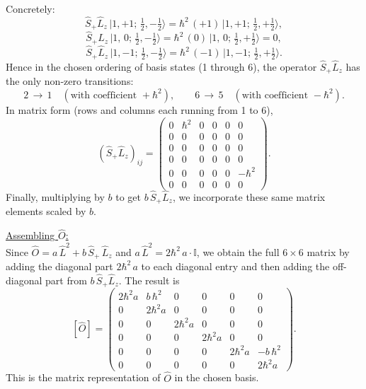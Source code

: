 \documentclass{article}
\begin{document}
Concretely:
\[
\hat{S}_+ \hat{L}_z\,\lvert 1,+1;\,\tfrac12,-\tfrac12\rangle 
= 
\hbar^2\,(+1)\,\lvert 1,+1;\,\tfrac12,+\tfrac12\rangle,
\]
\[
\hat{S}_+ \hat{L}_z\,\lvert 1,\,0;\,\tfrac12,-\tfrac12\rangle 
= 
\hbar^2\,(0)\,\lvert 1,\,0;\,\tfrac12,+\tfrac12\rangle = 0,
\]
\[
\hat{S}_+ \hat{L}_z\,\lvert 1,-1;\,\tfrac12,-\tfrac12\rangle 
= 
\hbar^2\,(-1)\,\lvert 1,-1;\,\tfrac12,+\tfrac12\rangle.
\]
Hence in the chosen ordering of basis states (1 through 6), the operator \(\hat{S}_+ \hat{L}_z\) has the only non-zero transitions:
\[
2 \,\longrightarrow\, 1 
\quad(\text{with coefficient } +\hbar^2),
\qquad
6 \,\longrightarrow\, 5
\quad(\text{with coefficient } -\hbar^2).
\]
In matrix form (rows and columns each running from 1 to 6), 
\[
(\hat{S}_+ \hat{L}_z)_{ij} 
=
\begin{pmatrix}
0 & \hbar^2 & 0 & 0 & 0 & 0 \\[6pt]
0 & 0       & 0 & 0 & 0 & 0 \\[6pt]
0 & 0       & 0 & 0 & 0 & 0 \\[6pt]
0 & 0       & 0 & 0 & 0 & 0 \\[6pt]
0 & 0       & 0 & 0 & 0 & -\hbar^2 \\[6pt]
0 & 0       & 0 & 0 & 0 & 0 
\end{pmatrix}.
\]
Finally, multiplying by \(b\) to get \(b\,\hat{S}_+ \hat{L}_z\), we incorporate these same matrix elements scaled by \(b\).

\underline{Assembling \(\hat{O}\):}\\
Since 
\(\hat{O} = a\,\hat{L}^2 + b\,\hat{S}_+\,\hat{L}_z\)
and 
\(a\,\hat{L}^2 = 2\hbar^2\,a\cdot\mathbb{I}\),
we obtain the full \(6\times 6\) matrix by adding the diagonal part 
\(2\hbar^2\,a\) 
to each diagonal entry and then adding the off-diagonal part from \(b\,\hat{S}_+\hat{L}_z\). The result is
\[
[\hat{O}] 
=
\begin{pmatrix}
2\hbar^2 a & b\,\hbar^2   & 0             & 0             & 0              & 0 \\
0          & 2\hbar^2 a   & 0             & 0             & 0              & 0 \\
0          & 0            & 2\hbar^2 a    & 0             & 0              & 0 \\
0          & 0            & 0             & 2\hbar^2 a    & 0              & 0 \\
0          & 0            & 0             & 0             & 2\hbar^2 a     & -b\,\hbar^2 \\
0          & 0            & 0             & 0             & 0              & 2\hbar^2 a 
\end{pmatrix}.
\]
This is the matrix representation of \(\hat{O}\) in the chosen basis.
\end{document}

